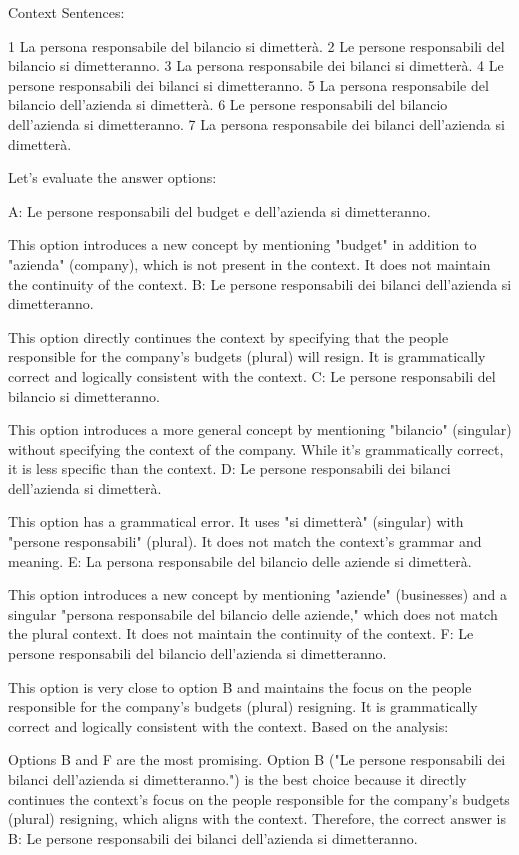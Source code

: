 Context Sentences:

1 La persona responsabile del bilancio si dimetterà.
2 Le persone responsabili del bilancio si dimetteranno.
3 La persona responsabile dei bilanci si dimetterà.
4 Le persone responsabili dei bilanci si dimetteranno.
5 La persona responsabile del bilancio dell'azienda si dimetterà.
6 Le persone responsabili del bilancio dell'azienda si dimetteranno.
7 La persona responsabile dei bilanci dell'azienda si dimetterà.


Let's evaluate the answer options:

A: Le persone responsabili del budget e dell'azienda si dimetteranno.

This option introduces a new concept by mentioning "budget" in addition to "azienda" (company), which is not present in the context. It does not maintain the continuity of the context.
B: Le persone responsabili dei bilanci dell'azienda si dimetteranno.

This option directly continues the context by specifying that the people responsible for the company's budgets (plural) will resign. It is grammatically correct and logically consistent with the context.
C: Le persone responsabili del bilancio si dimetteranno.

This option introduces a more general concept by mentioning "bilancio" (singular) without specifying the context of the company. While it's grammatically correct, it is less specific than the context.
D: Le persone responsabili dei bilanci dell'azienda si dimetterà.

This option has a grammatical error. It uses "si dimetterà" (singular) with "persone responsabili" (plural). It does not match the context's grammar and meaning.
E: La persona responsabile del bilancio delle aziende si dimetterà.

This option introduces a new concept by mentioning "aziende" (businesses) and a singular "persona responsabile del bilancio delle aziende," which does not match the plural context. It does not maintain the continuity of the context.
F: Le persone responsabili del bilancio dell'azienda si dimetteranno.

This option is very close to option B and maintains the focus on the people responsible for the company's budgets (plural) resigning. It is grammatically correct and logically consistent with the context.
Based on the analysis:

Options B and F are the most promising.
Option B ("Le persone responsabili dei bilanci dell'azienda si dimetteranno.") is the best choice because it directly continues the context's focus on the people responsible for the company's budgets (plural) resigning, which aligns with the context.
Therefore, the correct answer is B: Le persone responsabili dei bilanci dell'azienda si dimetteranno.


